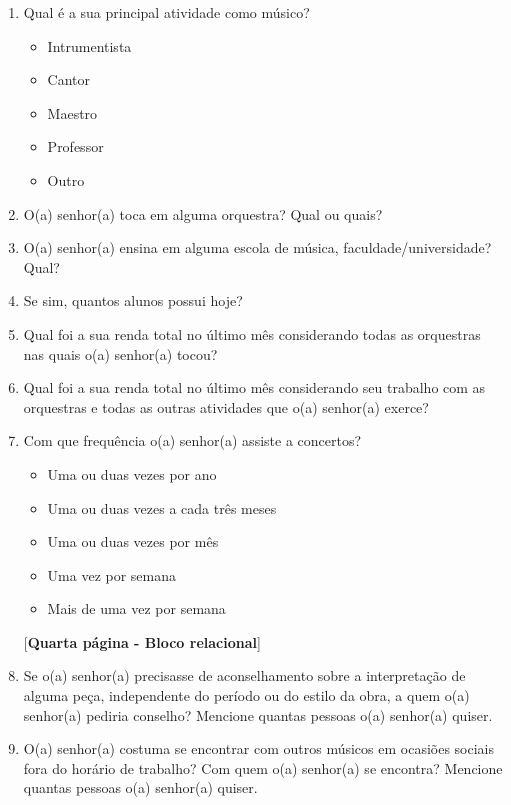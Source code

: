 \documentclass[a4paper, 12pt, openright, oneside, german, french, english, brazil]{abntex2}
\begin{document}
\begin{enumerate}
		
		
		
		\item Qual é a sua principal atividade como músico?
		\begin{itemize}
			\item Intrumentista
			\item Cantor
			\item Maestro
			\item Professor
			\item Outro
		\end{itemize}
		
		

		
		\item O(a) senhor(a) toca em alguma orquestra? Qual ou quais?
		
		\item O(a) senhor(a) ensina em alguma escola de música, faculdade/universidade? Qual?
		\item Se sim, quantos alunos possui hoje?
		\item Qual foi a sua renda total no último mês considerando todas as orquestras nas quais o(a) senhor(a) tocou?
		\item Qual foi a sua renda total no último mês considerando seu trabalho com as orquestras e todas as outras atividades que o(a) senhor(a) exerce?
		
		\item Com que frequência o(a) senhor(a) assiste a concertos?
		\begin{itemize}
			\item Uma ou duas vezes por ano
			\item Uma ou duas vezes a cada três meses
			\item Uma ou duas vezes por mês
			\item Uma vez por semana
			\item Mais de uma vez por semana
		\end{itemize}
		
		
		
		[\textbf{Quarta página - Bloco relacional}]
		
		
		\item Se o(a) senhor(a) precisasse de aconselhamento sobre a interpretação de alguma peça, independente do período ou do estilo da obra, a quem o(a) senhor(a) pediria conselho? Mencione quantas pessoas o(a) senhor(a) quiser.
		
		\item O(a) senhor(a) costuma se encontrar com outros músicos em ocasiões sociais fora do horário de trabalho? Com quem o(a) senhor(a) se encontra? Mencione quantas pessoas o(a) senhor(a) quiser.
		

\end{enumerate}
\end{document}
